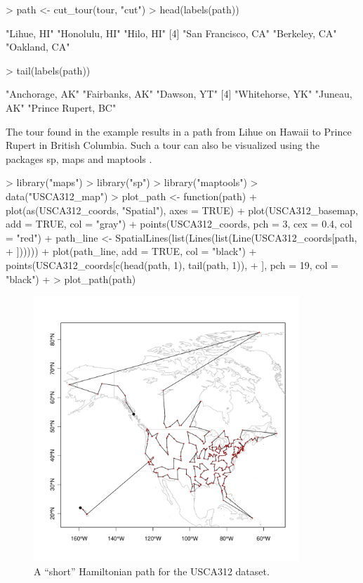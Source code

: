 \documentclass[10pt,a4paper,fleqn]{article}
\newcommand{\strong}[1]{{\normalfont\fontseries{b}\selectfont #1}}
\newcommand{\pkg}[1]{\strong{#1}}
\begin{document}
\begin{Schunk}
\begin{Sinput}
> path <- cut_tour(tour, "cut")
> head(labels(path))
\end{Sinput}
\begin{Soutput}
[1] "Lihue, HI"         "Honolulu, HI"      "Hilo, HI"         
[4] "San Francisco, CA" "Berkeley, CA"      "Oakland, CA"      
\end{Soutput}
\begin{Sinput}
> tail(labels(path))
\end{Sinput}
\begin{Soutput}
[1] "Anchorage, AK"     "Fairbanks, AK"     "Dawson, YT"       
[4] "Whitehorse, YK"    "Juneau, AK"        "Prince Rupert, BC"
\end{Soutput}
\end{Schunk}

The tour found in the example results in a path from Lihue on Hawaii to
Prince Rupert in British Columbia. Such a tour can also be visualized
using the packages \pkg{sp}, \pkg{maps} and \pkg{maptools}
\citep{TSP:Pebesma+Bivand:2005}.

\begin{Schunk}
\begin{Sinput}
> library("maps")
> library("sp")
> library("maptools")
> data("USCA312_map")
> plot_path <- function(path) {
+     plot(as(USCA312_coords, "Spatial"), axes = TRUE)
+     plot(USCA312_basemap, add = TRUE, col = "gray")
+     points(USCA312_coords, pch = 3, cex = 0.4, col = "red")
+     path_line <- SpatialLines(list(Lines(list(Line(USCA312_coords[path, 
+         ])))))
+     plot(path_line, add = TRUE, col = "black")
+     points(USCA312_coords[c(head(path, 1), tail(path, 1)), 
+         ], pch = 19, col = "black")
+ }
> plot_path(path)
\end{Sinput}
\end{Schunk}

\begin{figure}
\centering
\includegraphics[width=10cm, trim=0 30 0 0]{TSP-map1}
\caption{A ``short'' Hamiltonian path for the USCA312 dataset.}
\label{fig:map1}
\end{figure}
\end{document}
